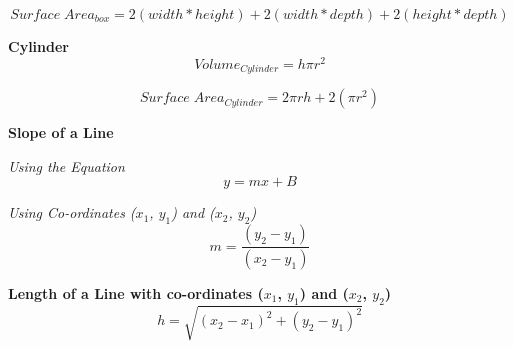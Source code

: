 \documentclass{article}
\begin{document}
\begin{equation}
Surface\;Area_{box} = 2(width * height) + 2(width * depth) + 2(height * depth)
\end{equation}

\textbf{Cylinder}
\begin{equation}
Volume_{ Cylinder} = h \pi r^ 2
\end{equation}

\begin{equation}
Surface\;Area_{ Cylinder} = 2 \pi r h + 2(\pi r^ 2 )
\end{equation}

\textbf{Slope of a Line}

\textit{Using the Equation}
\begin{equation}
y = mx + B
\end{equation}

\textit{Using Co-ordinates ($x_1$, $y_1$) and ($x_2$, $y_2$) }
\begin{equation}
m = \frac{ (y_2 - y_1) }{ (x_2 - y_1) }
\end{equation}

\textbf{Length of a Line with co-ordinates  ($x_1$, $y_1$) and ($x_2$, $y_2$) }
\begin{equation}
h= \sqrt{(x_{2}-x_{1})^2 + (y_{2}-y_{1})^2}
\end{equation}
\end{document}

